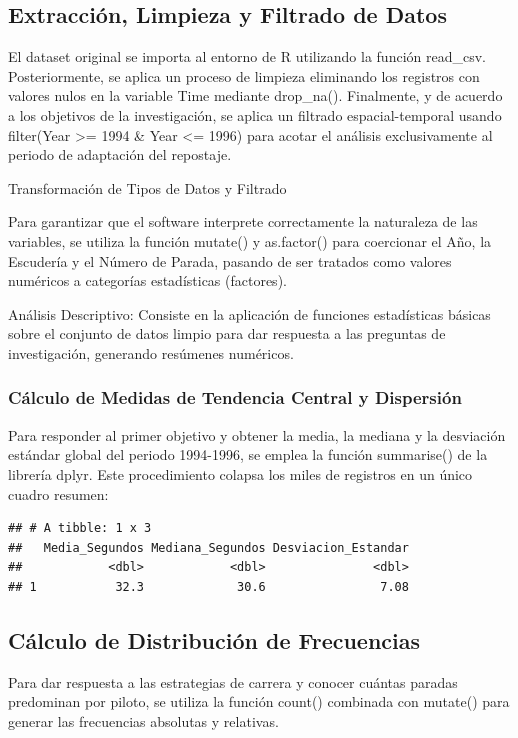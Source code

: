\documentclass[oneside,11pt]{Latex/Classes/PhDthesisPSnPDF}
\begin{document}
\subsection{Extracción, Limpieza y Filtrado de Datos}

El dataset original se importa al entorno de R utilizando la función
read\_csv. Posteriormente, se aplica un proceso de limpieza eliminando
los registros con valores nulos en la variable Time mediante drop\_na().
Finalmente, y de acuerdo a los objetivos de la investigación, se aplica
un filtrado espacial-temporal usando filter(Year \textgreater= 1994 \&
Year \textless= 1996) para acotar el análisis exclusivamente al periodo
de adaptación del repostaje.

Transformación de Tipos de Datos y Filtrado

Para garantizar que el software interprete correctamente la naturaleza
de las variables, se utiliza la función mutate() y as.factor() para
coercionar el Año, la Escudería y el Número de Parada, pasando de ser
tratados como valores numéricos a categorías estadísticas (factores).

Análisis Descriptivo: Consiste en la aplicación de funciones
estadísticas básicas sobre el conjunto de datos limpio para dar
respuesta a las preguntas de investigación, generando resúmenes
numéricos.

\subsubsection{Cálculo de Medidas de Tendencia Central y Dispersión}

Para responder al primer objetivo y obtener la media, la mediana y la
desviación estándar global del periodo 1994-1996, se emplea la función
summarise() de la librería dplyr. Este procedimiento colapsa los miles
de registros en un único cuadro resumen:

\begin{verbatim}
## # A tibble: 1 x 3
##   Media_Segundos Mediana_Segundos Desviacion_Estandar
##            <dbl>            <dbl>               <dbl>
## 1           32.3             30.6                7.08
\end{verbatim}

\subsection{Cálculo de Distribución de Frecuencias}

Para dar respuesta a las estrategias de carrera y conocer cuántas
paradas predominan por piloto, se utiliza la función count() combinada
con mutate() para generar las frecuencias absolutas y relativas.
\end{document}
